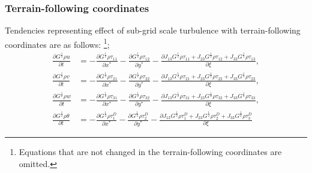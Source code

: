 \subsubsection{Terrain-following coordinates}
Tendencies representing effect of sub-grid scale turbulence with terrain-following coordinates are as follows:
\footnote{Equations that are not changed in the terrain-following coordinates are omitted.};
\begin{align}
  \frac{\partial G^{\frac{1}{2}}\rho u}{\partial t}
  &=
  - \frac{\partial G^{\frac{1}{2}}\rho\tau_{11}}{\partial x^*}
  - \frac{\partial G^{\frac{1}{2}}\rho\tau_{12}}{\partial y^*}
  - \frac{\partial J_{13}G^{\frac{1}{2}}\rho\tau_{11} + J_{23}G^{\frac{1}{2}}\rho\tau_{12} + J_{33}G^{\frac{1}{2}}\rho\tau_{13}}{\partial \xi}, \\
  \frac{\partial G^{\frac{1}{2}}\rho v}{\partial t}
  &=
  - \frac{\partial G^{\frac{1}{2}}\rho\tau_{21}}{\partial x^*}
  - \frac{\partial G^{\frac{1}{2}}\rho\tau_{22}}{\partial y^*}
  - \frac{\partial J_{13}G^{\frac{1}{2}}\rho\tau_{21} + J_{23}G^{\frac{1}{2}}\rho\tau_{22} + J_{33}G^{\frac{1}{2}}\rho\tau_{23}}{\partial \xi}, \\
  \frac{\partial G^{\frac{1}{2}}\rho w}{\partial t}
  &=
  - \frac{\partial G^{\frac{1}{2}}\rho\tau_{31}}{\partial x^*}
  - \frac{\partial G^{\frac{1}{2}}\rho\tau_{32}}{\partial y^*}
  - \frac{\partial J_{13}G^{\frac{1}{2}}\rho\tau_{31} + J_{23}G^{\frac{1}{2}}\rho\tau_{32} + J_{33}G^{\frac{1}{2}}\rho\tau_{33}}{\partial \xi}, \\
  \frac{\partial G^{\frac{1}{2}} \rho \theta}{\partial t}
  &=
  - \frac{\partial G^{\frac{1}{2}}\rho\tau^D_1}{\partial x^*}
  - \frac{\partial G^{\frac{1}{2}}\rho\tau^D_2}{\partial y^*}
  - \frac{\partial J_{13}G^{\frac{1}{2}}\rho\tau^D_1 + J_{23}G^{\frac{1}{2}}\rho\tau^D_2 + J_{33}G^{\frac{1}{2}}\rho\tau^D_3}{\partial \xi}
\end{align}
